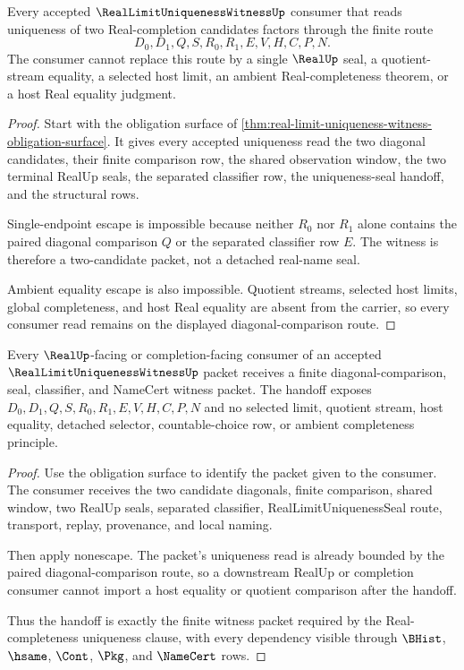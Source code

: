 \begin{theorem}
\label{thm:real-limit-uniqueness-witness-nonescape}
Every accepted $\RealLimitUniquenessWitnessUp$ consumer that reads uniqueness of two Real-completion candidates factors through the finite route
$$
D_0,D_1,Q,S,R_0,R_1,E,V,H,C,P,N.
$$
The consumer cannot replace this route by a single $\RealUp$ seal, a quotient-stream equality, a selected host limit, an ambient Real-completeness theorem, or a host Real equality judgment.
\end{theorem}
\begin{proof}
Start with the obligation surface of \autoref{thm:real-limit-uniqueness-witness-obligation-surface}. It gives every accepted uniqueness read the two diagonal candidates, their finite comparison row, the shared observation window, the two terminal RealUp seals, the separated classifier row, the uniqueness-seal handoff, and the structural rows.

Single-endpoint escape is impossible because neither $R_0$ nor $R_1$ alone contains the paired diagonal comparison $Q$ or the separated classifier row $E$. The witness is therefore a two-candidate packet, not a detached real-name seal.

Ambient equality escape is also impossible. Quotient streams, selected host limits, global completeness, and host Real equality are absent from the carrier, so every consumer read remains on the displayed diagonal-comparison route.
\end{proof}

\begin{theorem}
\label{thm:real-limit-uniqueness-witness-consumer-handoff}
Every $\RealUp$-facing or completion-facing consumer of an accepted $\RealLimitUniquenessWitnessUp$ packet receives a finite diagonal-comparison, seal, classifier, and NameCert witness packet. The handoff exposes $D_0,D_1,Q,S,R_0,R_1,E,V,H,C,P,N$ and no selected limit, quotient stream, host equality, detached selector, countable-choice row, or ambient completeness principle.
\end{theorem}
\begin{proof}
Use the obligation surface to identify the packet given to the consumer. The consumer receives the two candidate diagonals, finite comparison, shared window, two RealUp seals, separated classifier, RealLimitUniquenessSeal route, transport, replay, provenance, and local naming.

Then apply nonescape. The packet's uniqueness read is already bounded by the paired diagonal-comparison route, so a downstream RealUp or completion consumer cannot import a host equality or quotient comparison after the handoff.

Thus the handoff is exactly the finite witness packet required by the Real-completeness uniqueness clause, with every dependency visible through $\BHist$, $\hsame$, $\Cont$, $\Pkg$, and $\NameCert$ rows.
\end{proof}

